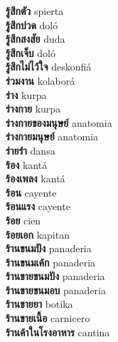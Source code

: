 \textbf{ รู้สึกตัว  } spierta \\
\textbf{ รู้สึกปวด  } doló \\
\textbf{ รู้สึกสงสัย  } duda \\
\textbf{ รู้สึกเจ็บ  } doló \\
\textbf{ รู้สึกไม่ไว้ใจ  } deskonfiá \\
\textbf{ ร่วมงาน  } kolaborá \\
\textbf{ ร่าง  } kurpa \\
\textbf{ ร่างกาย  } kurpa \\
\textbf{ ร่างกายของมนุษย์  } anatomia \\
\textbf{ ร่างกายมนุษย์  } anatomia \\
\textbf{ ร่ายรำ  } dansa \\
\textbf{ ร้อง  } kantá \\
\textbf{ ร้องเพลง  } kantá \\
\textbf{ ร้อน  } cayente \\
\textbf{ ร้อนแรง  } cayente \\
\textbf{ ร้อย  } cien \\
\textbf{ ร้อยเอก  } kapitan \\
\textbf{ ร้านขนมปัง  } panaderia \\
\textbf{ ร้านขนมเค้ก  } panaderia \\
\textbf{ ร้านขายขนมปัง  } panaderia \\
\textbf{ ร้านขายขนมอบ  } panaderia \\
\textbf{ ร้านขายยา  } botika \\
\textbf{ ร้านขายเนื้อ  } carnicero \\
\textbf{ ร้านค้าในโรงอาหาร  } cantina \\
